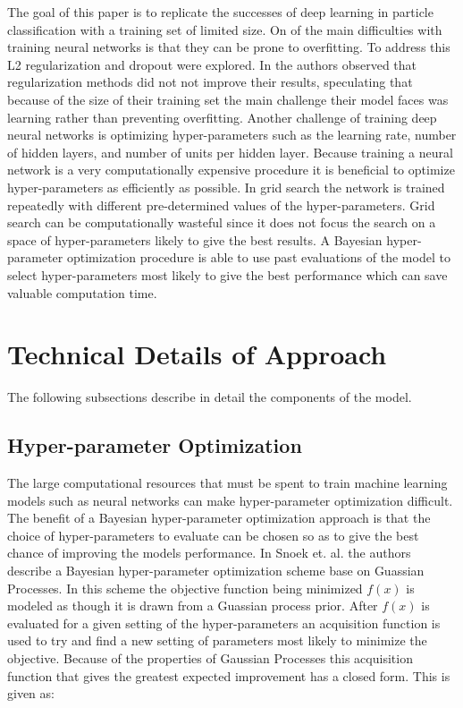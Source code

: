 \documentclass[12pt,letterpaper]{article}
\begin{document}
The goal of this paper is to replicate the successes of deep learning in particle classification with a training set of limited size. On of the main difficulties with training neural networks is that they can be prone to overfitting.  To address this L2 regularization and dropout were explored.  In \cite{Baldi:2014pta} the authors observed that regularization methods did not not improve their results, speculating that because of the size of their training set the main challenge their model faces was learning rather than preventing overfitting.  Another challenge of training deep neural networks is optimizing hyper-parameters such as the learning rate, number of hidden layers, and number of units per hidden layer.  Because training a neural network is a very computationally expensive procedure it is beneficial to optimize hyper-parameters as efficiently as possible.  In grid search the network is trained repeatedly with different pre-determined values of the hyper-parameters.  Grid search can be computationally wasteful since it does not focus the search on a space of hyper-parameters likely to give the best results.  A Bayesian hyper-parameter optimization procedure is able to use past evaluations of the model to select hyper-parameters most likely to give the best performance which can save valuable computation time.

\section{Technical Details of Approach}

The following subsections describe in detail the components of the model. 

\subsection{Hyper-parameter Optimization}
The large computational resources that must be spent to train machine learning models such as neural networks can make hyper-parameter optimization difficult.  The benefit of a Bayesian hyper-parameter optimization approach is that the choice of hyper-parameters to evaluate can be chosen so as to give the best chance of improving the models performance. In Snoek et. al. \cite{Snoek:2012:PBO:2999325.2999464} the authors describe a Bayesian hyper-parameter optimization scheme base on Guassian Processes.  In this scheme the objective function being minimized $f(x)$ is modeled as though it is drawn from a Guassian process prior.  After $f(x)$ is evaluated for a given setting of the hyper-parameters an acquisition function is used to try and find a new setting of parameters most likely to minimize the objective.  Because of the properties of Gaussian Processes this acquisition function that gives the greatest expected improvement has a closed form.  This is given as:
\end{document}
